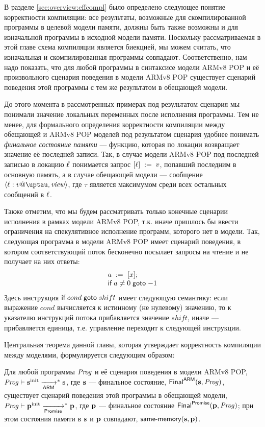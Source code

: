 В разделе \ref{sec:overview:effcompl} было определено следующее понятие корректности компиляции:
все результаты, возможные для скомпилированной программы в целевой модели памяти,
должны быть также возможны и для изначальной программы в исходной модели памяти.
Поскольку рассматриваемая в этой главе схема компиляции является биекцией,
мы можем считать, что изначальная и скомпилированная программы совпадают.
Соответственно, нам надо показать, что для любой программы в синтаксисе модели
ARMv8 POP и её произвольного сценария поведения в модели ARMv8 POP существует
сценарий поведения этой программы с тем же результатом в обещающей модели.

До этого момента в рассмотренных примерах под результатом сценария мы понимали значение
локальных переменных после исполнения программы.
Тем не менее, для формального определения корректности компиляции между
обещающей и ARMv8 POP моделей под результатом сценария удобнее понимать 
\emph{финальное состояние памяти} --- функцию, которая по локации
возвращает значение её последней записи.
Так, в случае модели ARMv8 POP под последней записью в локацию $\ell$ понимается
запрос $[\ell]\;:=\;v$, попавший последним в основную память,
а в случае обещающей модели --- сообщение $\angled{\loc:\val@\tau,\R}$,
где $\tau$ является максимумом среди всех остальных сообщений в $\ell$.


Также отметим, что мы будем рассматривать только конечные сценарии исполнения
в рамках модели ARMv8 POP, т.к. иначе пришлось бы ввести ограничения на
спекулятивное исполнение программ, которого нет в модели.
Так, следующая программа в модели ARMv8 POP имеет сценарий поведения,
в котором соответствующий поток бесконечно посылает запросы на чтение и
не получает на них ответы:
\[\begin{array}{l}
a \;:=_{}\;[x]; \\
\textsf{if} \; a \not = 0 \; \textsf{goto} \; {-1}
\end{array}\]
Здесь инструкция $\textsf{if} \; cond \; \textsf{goto} \; shift$ имеет следующую семантику:
если выражение $cond$ вычисляется к истинному (не нулевому) значению,
то к указателю инструкций потока прибавляется значение $shift$,
иначе --- прибавляется единица, т.е. управление переходит к следующей инструкции.

Центральная теорема данной главы, которая утверждает корректность компиляции между
моделями, формулируется следующим образом:
\begin{theorem}
  \label{armvpop:mainthm}
  Для любой программы $\mathit{Prog}$ и её сценария поведения в модели ARMv8 POP,
  $\mathit{Prog} \vdash \mathbf{s}^{\rm init} \xrightarrow[\mathsf{ARM}]{}^{*} \mathbf{s}$,
  где $\mathbf{s}$ --- финальное состояние, $\mathsf{Final}^{\mathsf{ARM}}(\mathbf{s}, \mathit{Prog})$,
  существует сценарий поведения этой программы в обещающей модели,
  $\mathit{Prog} \vdash \mathbf{p}^{\rm init} \xrightarrow[\mathsf{Promise}]{}^{*} \mathbf{p}$,
  где $\mathbf{p}$ --- финальное состояние $\mathsf{Final}^{\mathsf{Promise}}(\mathbf{p}, \mathit{Prog})$;
  при этом состояния памяти в $\mathbf{s}$ и $\mathbf{p}$ совпадают, $\textup{\sf same-memory}(\mathbf{s}, \mathbf{p})$.
\end{theorem}

